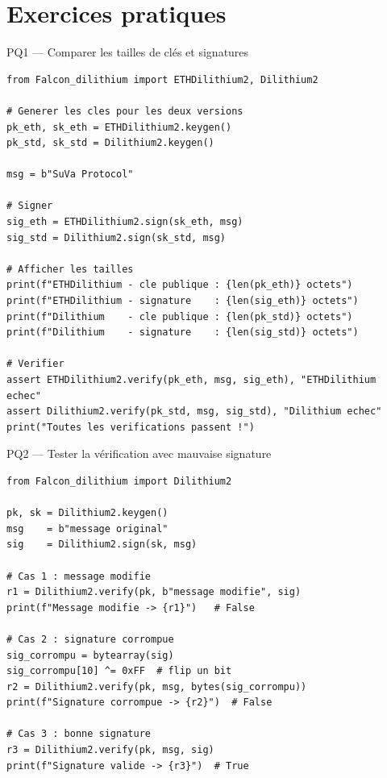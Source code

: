 \documentclass[12pt, a4paper]{article}
\begin{document}
\section{Exercices pratiques}

\begin{pratique}{PQ1 --- Comparer les tailles de clés et signatures}
\begin{lstlisting}[style=python]
from Falcon_dilithium import ETHDilithium2, Dilithium2

# Generer les cles pour les deux versions
pk_eth, sk_eth = ETHDilithium2.keygen()
pk_std, sk_std = Dilithium2.keygen()

msg = b"SuVa Protocol"

# Signer
sig_eth = ETHDilithium2.sign(sk_eth, msg)
sig_std = Dilithium2.sign(sk_std, msg)

# Afficher les tailles
print(f"ETHDilithium - cle publique : {len(pk_eth)} octets")
print(f"ETHDilithium - signature    : {len(sig_eth)} octets")
print(f"Dilithium    - cle publique : {len(pk_std)} octets")
print(f"Dilithium    - signature    : {len(sig_std)} octets")

# Verifier
assert ETHDilithium2.verify(pk_eth, msg, sig_eth), "ETHDilithium echec"
assert Dilithium2.verify(pk_std, msg, sig_std), "Dilithium echec"
print("Toutes les verifications passent !")
\end{lstlisting}
\end{pratique}

\begin{pratique}{PQ2 --- Tester la vérification avec mauvaise signature}
\begin{lstlisting}[style=python]
from Falcon_dilithium import Dilithium2

pk, sk = Dilithium2.keygen()
msg    = b"message original"
sig    = Dilithium2.sign(sk, msg)

# Cas 1 : message modifie
r1 = Dilithium2.verify(pk, b"message modifie", sig)
print(f"Message modifie -> {r1}")   # False

# Cas 2 : signature corrompue
sig_corrompu = bytearray(sig)
sig_corrompu[10] ^= 0xFF  # flip un bit
r2 = Dilithium2.verify(pk, msg, bytes(sig_corrompu))
print(f"Signature corrompue -> {r2}")  # False

# Cas 3 : bonne signature
r3 = Dilithium2.verify(pk, msg, sig)
print(f"Signature valide -> {r3}")  # True
\end{lstlisting}
\end{pratique}
\end{document}
